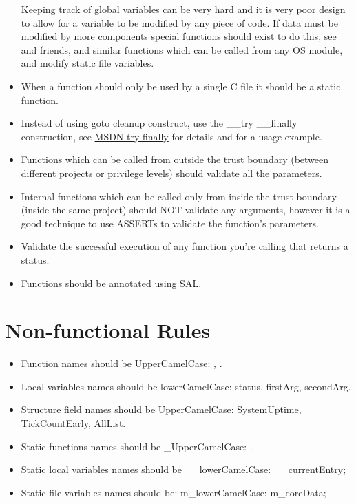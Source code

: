 \begin{appendices}
\begin{itemize}
	Keeping track of global variables can be very hard and it is very poor design to allow for a
variable to be modified by any piece of code. If data must be modified by more components special
functions should exist to do this, see  and friends, 
and similar functions which can be called from any OS module, and modify static file variables.

	\item When a function should only be used by a single C file it should be a static function.

	\item Instead of using goto cleanup construct, use the \_\_try \_\_finally construction, see
\href{https://msdn.microsoft.com/en-us/library/9xtt5hxz.aspx}{MSDN try-finally} for details and
 for a usage example.

	\item Functions which can be called from outside the trust boundary (between different projects
or privilege levels) should validate all the parameters.

	\item Internal functions which can be called only from inside the trust boundary (inside the
same project) should NOT validate any arguments, however it is a good technique to use ASSERTs to
validate the function's parameters.

	\item Validate the successful execution of any function you're calling that returns a status.

	\item Functions should be annotated using SAL.
\end{itemize}

\section{Non-functional Rules}
\begin{itemize}
	\item Function names should be UpperCamelCase: , .
	\item Local variables names should be lowerCamelCase: status, firstArg, secondArg.
	\item Structure field names should be UpperCamelCase: SystemUptime, TickCountEarly, AllList.

	\item Static functions names should be \_UpperCamelCase: .
	\item Static local variables names should be \_\_lowerCamelCase: \_\_currentEntry;
	\item Static file variables names should be: m\_lowerCamelCase: m\_coreData;


\end{itemize}
\end{appendices}
